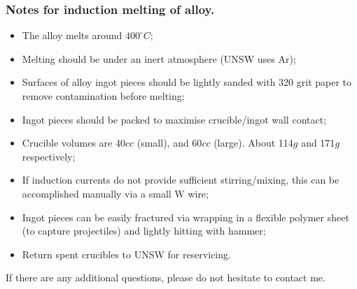 \subsubsection{Notes for induction melting of \MgZnCa alloy.}
\begin{itemize}
\item The \MgZnCa alloy melts around $400^{\circ}C$;
\item Melting should be under an inert atmosphere (UNSW uses Ar);
\item Surfaces of alloy ingot pieces should be lightly sanded with 320 grit paper to remove contamination before melting;
\item Ingot pieces should be packed to maximise crucible/ingot wall contact;
\item Crucible volumes are 40$cc$ (small), and 60$cc$ (large). About 114$g$ and 171$g$ respectively;
\item If induction currents do not provide sufficient stirring/mixing, this can be accomplished manually via a small W wire; 
\item Ingot pieces can be easily fractured via wrapping in a flexible polymer sheet (to capture projectiles) and lightly hitting with hammer;
\item Return spent crucibles to UNSW for reservicing. 
\end{itemize}

If there are any additional questions, please do not hesitate to contact me. 